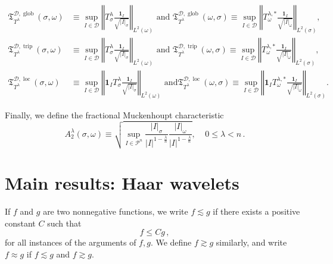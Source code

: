 \documentclass{amsart}%
\theoremstyle{plain}
\numberwithin{equation}{section}
\begin{document}
\begin{align*}
\mathfrak{T}_{T^{\lambda}}^{\mathcal{D},\operatorname*{glob}}\left(
\sigma,\omega\right)   &  \equiv\sup_{I\in\mathcal{D}}\left\Vert T_{\sigma
}^{\lambda}\frac{\mathbf{1}_{I}}{\sqrt{\left\vert I\right\vert _{\sigma}}%
}\right\Vert _{L^{2}\left(  \omega\right)  }\text{ and }\mathfrak{T}%
_{T^{\lambda}}^{\mathcal{D},\operatorname*{glob}}\left(  \omega,\sigma\right)
\equiv\sup_{I\in\mathcal{D}}\left\Vert T_{\omega}^{\lambda,\ast}%
\frac{\mathbf{1}_{I}}{\sqrt{\left\vert I\right\vert _{\omega}}}\right\Vert
_{L^{2}\left(  \sigma\right)  },\\
\mathfrak{T}_{T^{\lambda}}^{\mathcal{D},\operatorname*{trip}}\left(
\sigma,\omega\right)   &  \equiv\sup_{I\in\mathcal{D}}\left\Vert T_{\sigma
}^{\lambda}\frac{\mathbf{1}_{I}}{\sqrt{\left\vert I\right\vert _{\sigma}}%
}\right\Vert _{L^{2}\left(  \omega\right)  }\text{ and }\mathfrak{T}%
_{T^{\lambda}}^{\mathcal{D},\operatorname*{trip}}\left(  \omega,\sigma\right)
\equiv\sup_{I\in\mathcal{D}}\left\Vert T_{\omega}^{\lambda,\ast}%
\frac{\mathbf{1}_{I}}{\sqrt{\left\vert I\right\vert _{\omega}}}\right\Vert
_{L^{2}\left(  \sigma\right)  },\\
\mathfrak{T}_{T^{\lambda}}^{\mathcal{D},\operatorname{loc}}\left(
\sigma,\omega\right)   &  \equiv\sup_{I\in\mathcal{D}}\left\Vert
\mathbf{1}_{I}T_{\sigma}^{\lambda}\frac{\mathbf{1}_{I}}{\sqrt{\left\vert
I\right\vert _{\sigma}}}\right\Vert _{L^{2}\left(  \omega\right)  }\text{ and
}\mathfrak{T}_{T^{\lambda}}^{\mathcal{D},\operatorname{loc}}\left(
\omega,\sigma\right)  \equiv\sup_{I\in\mathcal{D}}\left\Vert \mathbf{1}%
_{I}T_{\omega}^{\lambda,\ast}\frac{\mathbf{1}_{I}}{\sqrt{\left\vert
I\right\vert _{\omega}}}\right\Vert _{L^{2}\left(  \sigma\right)  }.
\end{align*}


Finally, we define the fractional Muckenhoupt characteristic%
\begin{equation}
\label{eq:A2}A_{2}^{\lambda}\left(  \sigma,\omega\right)  \equiv\sqrt
{\sup_{I\in\mathcal{P}^{n}}\frac{\left\vert I\right\vert _{\sigma}}{\left\vert
I\right\vert ^{1-\frac{\lambda}{n}}}\frac{\left\vert I\right\vert _{\omega}%
}{\left\vert I\right\vert ^{1-\frac{\lambda}{n}}}},\ \ \ \ \ 0\leq\lambda<n \, .
\end{equation}

\section{Main results: Haar wavelets}\label{section:Haar_results}
If $f$ and $g$ are two nonnegative functions, we write $f \lesssim g$ if there exists a positive constant $C$ such that
\[
f \leq C g \, ,
\]
for all instances of the arguments of $f, g$. We define $f \gtrsim g$ similarly, and write $f \approx g$ if $f \lesssim g$ and $f \gtrsim g$.
\end{document}
